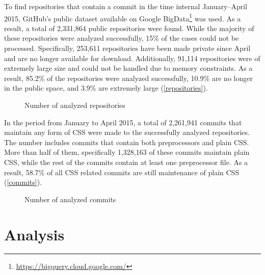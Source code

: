 To find repositories that contain a commit in the time internal January--April
2015, GitHub's public dataset available on Google
BigData\footnote{\url{https://bigquery.cloud.google.com/}} was used. As a result, a
total of 2,331,864 public repositories were found. While the majority of these
repositories were analyzed successfully, 15\% of the cases could not be
processed. Specifically, 253,611 repositories have been made private since
April and are no longer available for download. Additionally, 91,114
repositories were of extremely large size and could not be handled due to
memory constraints. As a result, 85.2\% of the repositories were analyzed
successfully, 10.9\% are no longer in the public space, and 3.9\% are
extremely large (\autoref{repositories}).

\begin{figure}
  \centering
  \caption{
    \label{repositories}
    Number of analyzed repositories}
\end{figure}


In the period from January to April 2015, a total of 2,261,941 commits that maintain
any form of CSS were made to the successfully analyzed repositories. The
number includes commits that contain both preprocessors and plain CSS. More
than half of them, specifically 1,328,163 of these commits maintain plain CSS,
while the rest of the commits contain at least one preprocessor file. As a
result, 58.7\% of all CSS related commits are still maintenance of plain CSS
(\autoref{commits}).

\begin{figure}
  \centering
  \caption{
    \label{commits}
  	Number of analyzed commits}
\end{figure}

\section{Analysis}

